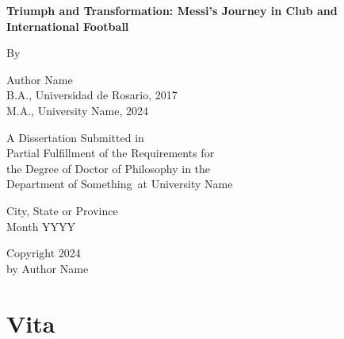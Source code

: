 \documentclass{report}
\newcommand{\university}{University Name}
\newcommand{\department}{Department of Something}
\begin{document}
\begin{titlepage}
    \begin{center}
        \vspace*{0.5cm}
        \linespread{1.3}
        
        \LARGE
        \textbf{Triumph and Transformation: Messi's Journey in Club and International Football}
        
        \vspace{2.5cm}
        
        \normalsize
        By
        
        \vspace{1cm}
        \large Author Name \\
        \vspace{0.25cm}
        \normalsize
        B.A., Universidad de Rosario, 2017 \\
        M.A., \university, 2024
            
        \vspace{3cm}
        \large

        A Dissertation Submitted in                           \\
        Partial Fulfillment of the Requirements for           \\
        the Degree of Doctor of Philosophy in the             \\
        \department\ at \university
            
        \vspace{4.5cm}
        
        City, State or Province \\
        Month YYYY
            
    \end{center}
\end{titlepage}

\newpage
{}
\begin{minipage}[b]{0.9\textwidth}\centering
\vspace{0.45\textheight}
\textcopyright{} Copyright 2024 \\
by Author Name
\end{minipage}

\newpage


\doublespacing
{}
\pagestyle{plain}
\setcounter{page}{4}

\chapter*{Vita}
\end{document}
